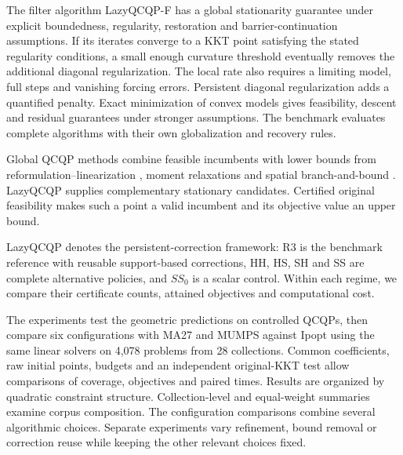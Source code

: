 \documentclass[pdflatex,sn-mathphys-num]{sn-jnl}
\theoremstyle{thmstyleone}
\theoremstyle{thmstylethree}
\newcounter{algorithm}
\begin{document}
The filter algorithm LazyQCQP-F has a global stationarity guarantee under
explicit boundedness, regularity, restoration and barrier-continuation
assumptions. If its iterates converge to a KKT point satisfying the stated
regularity conditions, a small enough curvature threshold eventually removes
the additional diagonal regularization. The local rate also requires a
limiting model, full steps and vanishing forcing errors. Persistent diagonal
regularization adds a quantified penalty. Exact minimization of convex
models gives feasibility, descent and residual guarantees under stronger
assumptions. The benchmark evaluates complete algorithms with their own
globalization and recovery rules.

Global QCQP methods combine feasible incumbents with lower bounds from
reformulation--linearization \citep{SheraliTuncbilek1992}, moment relaxations
\citep{Lasserre2001} and spatial branch-and-bound
\citep{TawarmalaniSahinidis2005}. LazyQCQP supplies complementary stationary candidates. Certified original
feasibility makes such a point a valid incumbent and its objective value
an upper bound.

LazyQCQP denotes the persistent-correction framework: R3 is the
benchmark reference with reusable support-based corrections, HH, HS, SH and SS are complete
alternative policies, and $SS_0$ is a scalar control. Within each regime, we compare their certificate counts, attained
objectives and computational cost.

The experiments test the geometric predictions on controlled
QCQPs, then compare six configurations with MA27 and MUMPS against
Ipopt using the same linear solvers on 4,078 problems from 28
collections. Common coefficients, raw initial points, budgets and an
independent original-KKT test allow comparisons of coverage,
objectives and paired times. Results are organized by quadratic
constraint structure. Collection-level and equal-weight summaries
examine corpus composition. The configuration comparisons combine several algorithmic choices.
Separate experiments vary refinement, bound removal or correction reuse
while keeping the other relevant choices fixed.
\end{document}
